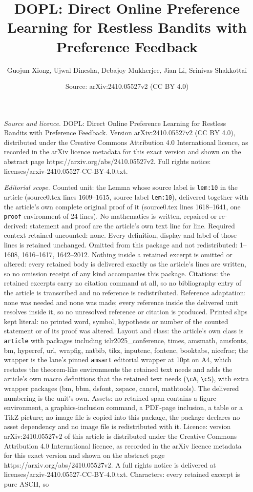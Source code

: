 \documentclass[10pt,a4paper]{amsart}
\title[DOPL: Direct Online Preference Learning for Restless Bandits]{DOPL: Direct Online Preference Learning for Restless Bandits with Preference Feedback}
\author{Guojun Xiong, Ujwal Dinesha, Debajoy Mukherjee, Jian Li, Srinivas Shakkottai}
\date{Source: arXiv:2410.05527v2 (CC BY 4.0)}
\begin{document}
\maketitle

\noindent\emph{Source and licence.} DOPL: Direct Online Preference Learning for Restless Bandits with Preference Feedback. Version arXiv:2410.05527v2 (CC BY 4.0), distributed under the Creative Commons Attribution 4.0 International licence, as recorded in the arXiv licence metadata for this exact version and shown on the abstract page https://arxiv.org/abs/2410.05527v2. Full rights notice: licenses/arxiv-2410.05527-CC-BY-4.0.txt.\par\smallskip

\noindent\textit{Editorial scope.} Counted unit: the Lemma whose source label is \texttt{lem:10} in the article (source0.tex lines 1609--1615, source label \texttt{lem:10}), delivered together with the article's own complete original proof of it (source0.tex lines 1618--1641, one \texttt{proof} environment of 24 lines). No mathematics is written, repaired or re-derived: statement and proof are the article's own text line for line. Required context retained uncounted: none. Every definition, display and label of those lines is retained unchanged. Omitted from this package and not redistributed: 1--1608, 1616--1617, 1642--2012. Nothing inside a retained excerpt is omitted or altered: every retained body is delivered exactly as the article's lines are written, so no omission receipt of any kind accompanies this package. Citations: the retained excerpts carry no citation command at all, so no bibliography entry of the article is transcribed and no reference is redistributed. Reference adaptation: none was needed and none was made; every reference inside the delivered unit resolves inside it, so no unresolved reference or citation is produced. Printed slips kept literal: no printed word, symbol, hypothesis or number of the counted statement or of its proof was altered. Layout and class: the article's own class is \texttt{article} with packages including iclr2025\_conference, times, amsmath, amsfonts, bm, hyperref, url, wrapfig, natbib, tikz, inputenc, fontenc, booktabs, nicefrac; the wrapper is the lane's pinned \texttt{amsart} editorial wrapper at 10pt on A4, which restates the theorem-like environments the retained text needs and adds the article's own macro definitions that the retained text needs (\texttt{\textbackslash cA}, \texttt{\textbackslash cS}), with extra wrapper packages (bm, bbm, dsfont, xspace, cancel, mathtools). The delivered numbering is the unit's own. Assets: no retained span contains a figure environment, a graphics-inclusion command, a PDF-page inclusion, a table or a TikZ picture; no image file is copied into this package, the package declares no asset dependency and no image file is redistributed with it. Licence: version arXiv:2410.05527v2 of this article is distributed under the Creative Commons Attribution 4.0 International licence, as recorded in the arXiv licence metadata for this exact version and shown on the abstract page https://arxiv.org/abs/2410.05527v2. A full rights notice is delivered at licenses/arxiv-2410.05527-CC-BY-4.0.txt. Characters: every retained excerpt is pure ASCII, so 
\end{document}
